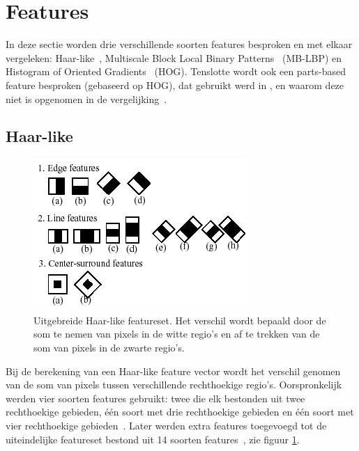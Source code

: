 \section{Features} \label{sec:feat}

In deze sectie worden drie verschillende soorten features besproken en met elkaar vergeleken: Haar-like~\cite{viola2001rapid}, Multiscale Block Local Binary Patterns~\cite{liao2007learning} (MB-LBP) en Histogram of Oriented Gradients~\cite{dalal2005histograms} (HOG). Tenslotte wordt ook een parts-based feature besproken (gebaseerd op HOG), dat gebruikt werd in \cite{aubry2014seeing}, en waarom deze niet is opgenomen in de vergelijking~\cite{felzenszwalb2010object}.



\subsection{Haar-like} \label{sec:feat_haarlike}

\begin{figure}
  \centering
  \includegraphics[width=.7\linewidth]{img/haar2}
  \caption{Uitgebreide Haar-like featureset. Het verschil wordt bepaald door de som te nemen van pixels in de witte regio's en af te trekken van de som van pixels in de zwarte regio's.}
  \label{fig:haarUitg}
\end{figure}

Bij de berekening van een Haar-like feature vector wordt het verschil genomen van de som van pixels tussen verschillende rechthoekige regio's. Oorspronkelijk werden vier soorten features gebruikt: twee die elk bestonden uit twee rechthoekige gebieden, \'e\'en soort met drie rechthoekige gebieden en \'e\'en soort met vier rechthoekige gebieden~\cite{viola2001rapid}. Later werden extra features toegevoegd tot de uiteindelijke featureset bestond uit 14 soorten features~\cite{lienhart2002extended}, zie figuur \ref{fig:haarUitg}.

